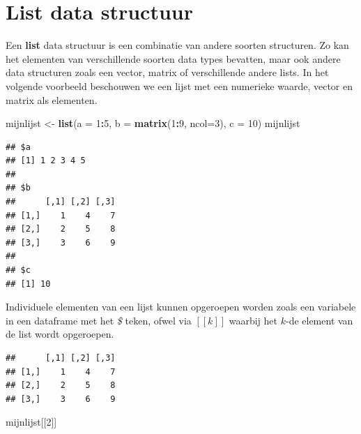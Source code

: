 \documentclass[
]{book}
\newenvironment{Shaded}{\begin{snugshade}}{\end{snugshade}}
\newcommand{\AttributeTok}[1]{\textcolor[rgb]{0.13,0.29,0.53}{#1}}
\newcommand{\DecValTok}[1]{\textcolor[rgb]{0.00,0.00,0.81}{#1}}
\newcommand{\FunctionTok}[1]{\textcolor[rgb]{0.13,0.29,0.53}{\textbf{#1}}}
\newcommand{\NormalTok}[1]{#1}
\newcommand{\OtherTok}[1]{\textcolor[rgb]{0.56,0.35,0.01}{#1}}
\newcommand{\SpecialCharTok}[1]{\textcolor[rgb]{0.81,0.36,0.00}{\textbf{#1}}}
\begin{document}
\hypertarget{list-data-structuur}{%
\section{List data structuur}\label{list-data-structuur}}

Een \textbf{list} data structuur is een combinatie van andere soorten structuren.
Zo kan het elementen van verschillende soorten data types bevatten, maar ook andere data structuren zoals een vector, matrix of verschillende andere lists.
In het volgende voorbeeld beschouwen we een lijst met een numerieke waarde, vector en matrix als elementen.

\begin{Shaded}
\begin{Highlighting}[]
\NormalTok{mijnlijst }\OtherTok{\textless{}{-}} \FunctionTok{list}\NormalTok{(}\AttributeTok{a =} \DecValTok{1}\SpecialCharTok{:}\DecValTok{5}\NormalTok{, }\AttributeTok{b =} \FunctionTok{matrix}\NormalTok{(}\DecValTok{1}\SpecialCharTok{:}\DecValTok{9}\NormalTok{, }\AttributeTok{ncol=}\DecValTok{3}\NormalTok{), }\AttributeTok{c =} \DecValTok{10}\NormalTok{)}
\NormalTok{mijnlijst}
\end{Highlighting}
\end{Shaded}

\begin{verbatim}
## $a
## [1] 1 2 3 4 5
## 
## $b
##      [,1] [,2] [,3]
## [1,]    1    4    7
## [2,]    2    5    8
## [3,]    3    6    9
## 
## $c
## [1] 10
\end{verbatim}

Individuele elementen van een lijst kunnen opgeroepen worden zoals een variabele in een dataframe met het \emph{\$} teken, ofwel via \([[k]]\) waarbij het \(k\)-de element van de list wordt opgeroepen.

\begin{Shaded}
\end{Shaded}

\begin{verbatim}
##      [,1] [,2] [,3]
## [1,]    1    4    7
## [2,]    2    5    8
## [3,]    3    6    9
\end{verbatim}

\begin{Shaded}
\begin{Highlighting}[]
\NormalTok{mijnlijst[[}\DecValTok{2}\NormalTok{]]}
\end{Highlighting}
\end{Shaded}
\end{document}
